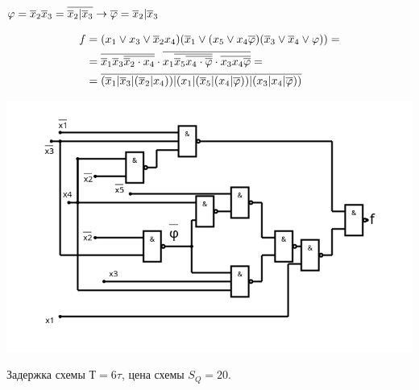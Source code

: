 $
\varphi = \overline{x}_{2}\overline{x}_{3} = \overline{\overline{x}_{2}|\overline{x}_{3}} \rightarrow \overline{\varphi} = \overline{x}_{2}|\overline{x}_{3} 
$

\begin{align*}
f &= (x_{1}\vee x_{3}\vee\overline{x}_{2}x_{4})(\overline{x}_{1}\vee(x_{5}\vee x_{4}\overline{\varphi})(\overline{x}_{3} \vee \overline{x}_{4} \vee \varphi)) = \\
  &=\overline{\overline{x}_{1}\overline{x}_{3} \overline{\overline{x}_{2}\cdot x_{4}}} \cdot
    \overline{
      x_{1} 
      \overline{ \overline{x}_{5} \overline{x_{4}\cdot\overline{\varphi}}} \cdot
      \overline{ x_{3}x_{4}\overline{\varphi}}
    } = \\
\
  &=\overline{(\overline{x}_{1}|\overline{x}_{3}|(\overline{x}_{2}|x_{4})) |
  (
    x_{1} |
    (\overline{x}_{5}|(x_{4}|\overline{\varphi})) |
    (x_{3}|x_{4}|\overline{\varphi})
  )}
\end{align*}

\begin{center}
\includegraphics[width=\linewidth]{imgs/circuit-ANDNOT_basis.png}
\end{center}
Задержка схемы $Т=6\tau$, цена схемы $S_Q=20$.